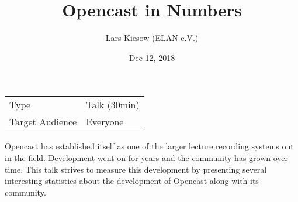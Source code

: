 \documentclass[a4paper]{article}
\title{Opencast in Numbers}
\date{Dec 12, 2018}
\author{Lars Kiesow (ELAN e.V.)}
\begin{document}
\maketitle

\begin{center}
\begin{tabular}{ll}
\toprule
	Type            & Talk (30min) \\
	Target Audience & Everyone \\
\bottomrule
\end{tabular}
\end{center}

\vspace{1em}

Opencast has established itself as one of the larger lecture recording systems
out in the field. Development went on for years and the community has grown
over time. This talk strives to measure this development by presenting several
interesting statistics about the development of Opencast along with its
community.
\end{document}
